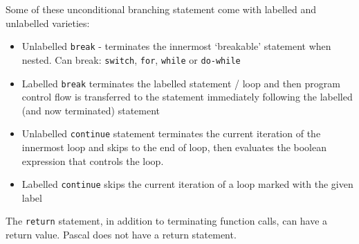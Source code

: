 Some of these unconditional branching statement come with labelled and unlabelled varieties:
\begin{itemize}
    \item Unlabelled \verb|break| - terminates the innermost `breakable' statement when nested. Can break: \verb|switch|, \verb|for|, \verb|while| or \verb|do-while|
    \item Labelled \verb|break| terminates the labelled statement / loop and then program control flow is transferred to the statement immediately following the labelled (and now terminated) statement
    \item Unlabelled \verb|continue| statement terminates the current iteration of the innermost loop and skips to the end of loop, then evaluates the boolean expression that controls the loop. 
    \item Labelled \verb|continue| skips the current iteration of a loop marked with the given label
\end{itemize}

The \verb|return| statement, in addition to terminating function calls, can have a return value. Pascal does not have a return statement.